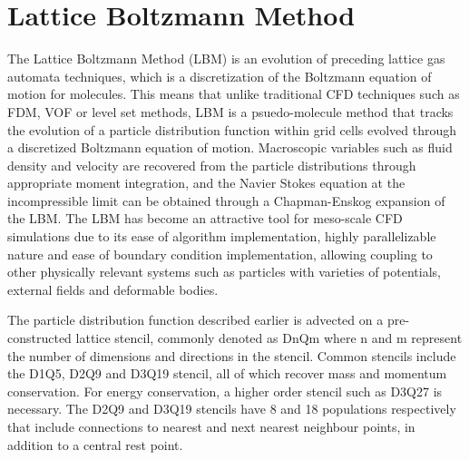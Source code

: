 \section{Lattice Boltzmann Method}

The Lattice Boltzmann Method (LBM) is an evolution of preceding lattice gas automata techniques, which is a discretization of the Boltzmann equation of motion for molecules. This means that unlike traditional CFD techniques such as FDM, VOF or level set methods, LBM is a psuedo-molecule method that tracks the evolution of a particle distribution function within grid cells evolved through a discretized Boltzmann equation of motion. Macroscopic variables such as fluid density and velocity are recovered from the particle distributions through appropriate moment integration, and the Navier Stokes equation at the incompressible limit can be obtained through a Chapman-Enskog expansion of the LBM. The LBM has become an attractive tool for meso-scale CFD simulations due to its ease of algorithm implementation, highly parallelizable nature and ease of boundary condition implementation, allowing coupling to other physically relevant systems such as particles with varieties of potentials, external fields and deformable bodies.

The particle distribution function described earlier is advected on a pre-constructed lattice stencil, commonly denoted as DnQm where n and m represent the number of dimensions and directions in the stencil. Common stencils include the D1Q5, D2Q9 and D3Q19 stencil, all of which recover mass and momentum conservation. For energy conservation, a higher order stencil such as D3Q27 is necessary. The D2Q9 and D3Q19 stencils have 8 and 18 populations respectively that include connections to nearest and next nearest neighbour points, in addition to a central rest point. 

